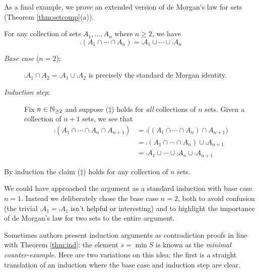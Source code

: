 

As a final example, we prove an extended version of de Morgan's law for sets (Theorem \ref{thm:setcomp}(a)).

\begin{example}{}{}
	For any collection of sets $A_1,\ldots,A_n$ where $n\ge 2$, we have
	\[
	 	\comp{(A_1\cap \cdots\cap A_n)}=\comp{A_1}\cup\cdots\cup\comp{A_n} \tag{$\ddag$}
	\]
	\begin{description}
		\item[\normalfont\emph{Base case} ($n=2$):] $\comp{A_1\cap A_2}=\comp{A_1}\cup\comp{A_2}$ is precisely the standard de Morgan identity.
		\item[\normalfont\emph{Induction step}:] Fix $n\in\mathbb{N}_{\ge 2}$ and suppose ($\ddag$) holds for \emph{all} collections of $n$ sets. Given a collection of $n+1$ sets, we see that
		\begin{align*}
			\comp{(A_1\cap \cdots\cap A_n\cap A_{n+1})} &=\comp{\bigl((A_1\cap \cdots\cap A_n)\cap A_{n+1}\bigr)}\\
			&=\comp{(A_1\cap \cdots\cap A_n)}\cup \comp{A_{n+1}} \tag{de Morgan again!}\\
			&=\comp{A_1}\cup\cdots\cup\comp{A_n}\cup\comp{A_{n+1}} \tag{induction hypothesis}
		\end{align*}
	\end{description}
	By induction the claim ($\ddag$) holds for any collection of $n$ sets.
\end{example}

We could have approached the argument as a standard induction with base case $n=1$. Instead we deliberately chose the base case $n=2$, both to avoid confusion (the trivial $\comp{A_1}=\comp{A_1}$ isn't helpful or interesting) and to highlight the importance of de Morgan's law for two sets to the entire argument.


Sometimes authors present induction arguments as contradiction proofs in line with Theorem \ref{thm:ind}: the element $s=\min S$ is known as the \emph{minimal counter-example.} Here are two variations on this idea; the first is a straight translation of an induction where the base case and induction step are clear.

